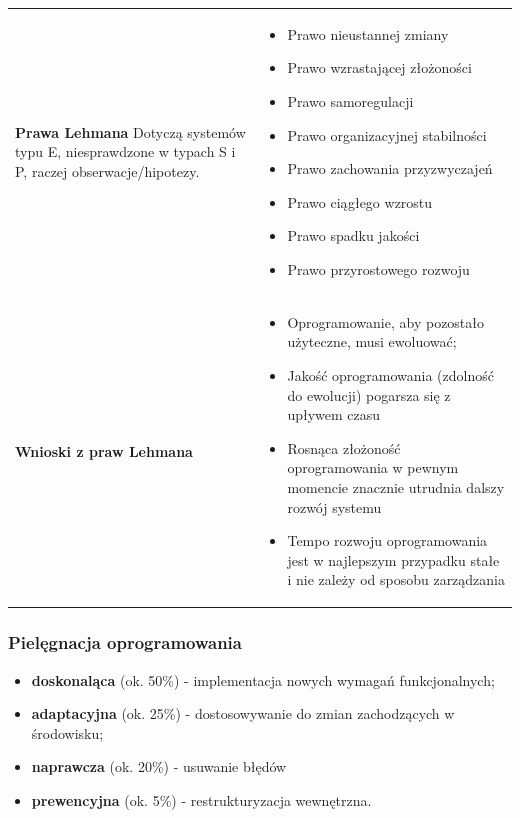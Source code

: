 \documentclass[a4paper]{article}
\begin{document}
    \begin{table}[H]
        \begin{center}
            \begin{tabular}{ p{3cm} p{13cm}}
                \textbf{Prawa Lehmana}
                Dotyczą systemów typu E, niesprawdzone w typach S i P, raczej obserwacje/hipotezy.
                &
                \begin{itemize}
                    \item Prawo nieustannej zmiany
                    \item Prawo wzrastającej złożoności
                    \item Prawo samoregulacji
                    \item Prawo organizacyjnej stabilności
                    \item Prawo zachowania przyzwyczajeń
                    \item Prawo ciągłego wzrostu
                    \item Prawo spadku jakości
                    \item Prawo przyrostowego rozwoju
                \end{itemize}
                \\

                \textbf{Wnioski z praw Lehmana}
                &
                \begin{itemize}
                    \item Oprogramowanie, aby pozostało użyteczne, musi ewoluować;
                    \item Jakość oprogramowania (zdolność do ewolucji) pogarsza się z upływem czasu
                    \item Rosnąca złożoność oprogramowania w pewnym momencie znacznie utrudnia dalszy rozwój systemu
                    \item Tempo rozwoju oprogramowania jest w najlepszym przypadku stałe i nie zależy od
                    sposobu zarządzania
                \end{itemize}

            \end{tabular}
        \end{center}
    \end{table}


    \subsubsection{Pielęgnacja oprogramowania}
    \begin{itemize}
        \item \textbf{doskonaląca} (ok. 50\%) - implementacja nowych wymagań
        funkcjonalnych;
        \item \textbf{adaptacyjna} (ok. 25\%) - dostosowywanie do zmian zachodzących w środowisku;
        \item \textbf{naprawcza} (ok. 20\%) - usuwanie błędów
        \item \textbf{prewencyjna} (ok. 5\%) - restrukturyzacja wewnętrzna.
    \end{itemize}
\end{document}
